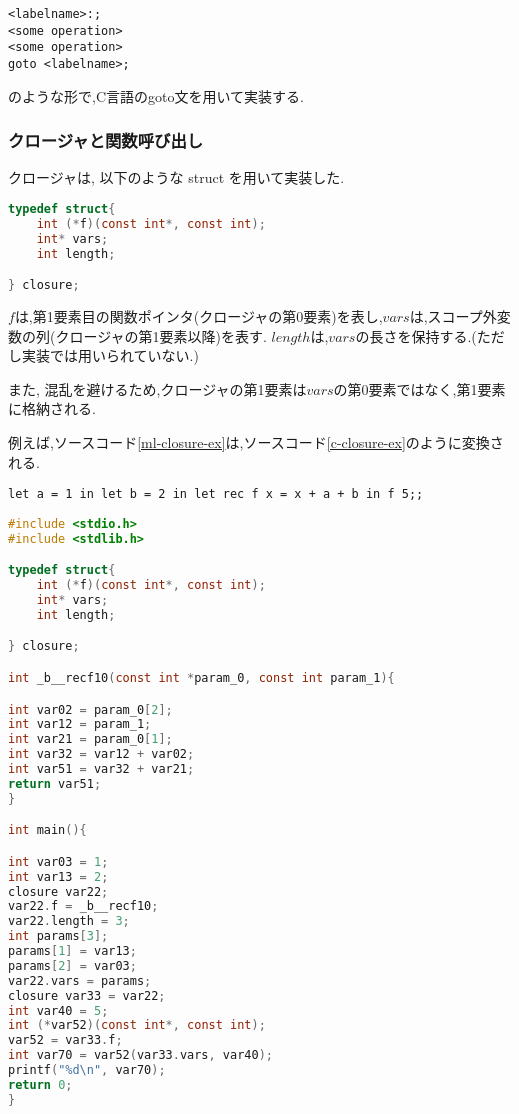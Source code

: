 \begin{lstlisting}
<labelname>:;
<some operation>
<some operation>
goto <labelname>;
\end{lstlisting}

のような形で,C言語のgoto文を用いて実装する.

\subsubsection*{クロージャと関数呼び出し}

クロージャは, 以下のような struct を用いて実装した.

\begin{lstlisting}[language=C, caption=C言語でのクロージャの実装]
typedef struct{
    int (*f)(const int*, const int);
    int* vars;
    int length;

} closure;
\end{lstlisting}

$f$は,第1要素目の関数ポインタ(クロージャの第0要素)を表し,$vars$は,スコープ外変数の列(クロージャの第1要素以降)を表す.
$length$は,$vars$の長さを保持する.(ただし実装では用いられていない.)

また, 混乱を避けるため,クロージャの第1要素は$vars$の第0要素ではなく,第1要素に格納される.

例えば,ソースコード\ref{ml-closure-ex}は,ソースコード\ref{c-closure-ex}のように変換される.

\begin{lstlisting}[caption=クロージャを含むMLコード, label=ml-closure-ex]
let a = 1 in let b = 2 in let rec f x = x + a + b in f 5;;
\end{lstlisting}

\begin{lstlisting}[caption=クロージャの変換例, language=C, label=c-closure-ex]
#include <stdio.h>
#include <stdlib.h>

typedef struct{
    int (*f)(const int*, const int);
    int* vars;
    int length;

} closure;

int _b__recf10(const int *param_0, const int param_1){

int var02 = param_0[2];
int var12 = param_1;
int var21 = param_0[1];
int var32 = var12 + var02;
int var51 = var32 + var21;
return var51;
}

int main(){

int var03 = 1;
int var13 = 2;
closure var22;
var22.f = _b__recf10;
var22.length = 3;
int params[3];
params[1] = var13;
params[2] = var03;
var22.vars = params;
closure var33 = var22;
int var40 = 5;
int (*var52)(const int*, const int);
var52 = var33.f;
int var70 = var52(var33.vars, var40);
printf("%d\n", var70);
return 0;
}
\end{lstlisting}


